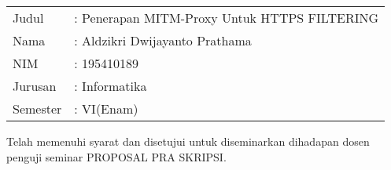 \documentclass[../PROPOSAL_PRA_SKRIPSI_ALDZIKRI_DWIJAYANTO_PRATHAMA.tex]{subfiles}
\begin{document}
\section*{}
\vspace{5ex}
\begin{tabular}{ll}
  Judul    &: Penerapan MITM-Proxy Untuk HTTPS FILTERING\\[5ex]
  Nama     &: Aldzikri Dwijayanto Prathama\\[5ex]
  NIM      &: 195410189\\[5ex]
  Jurusan  &: Informatika\\[5ex]
  Semester &: VI(Enam)\\[5ex]
\end{tabular}
\begin{center}
  Telah memenuhi syarat dan disetujui untuk diseminarkan
  dihadapan dosen penguji seminar PROPOSAL PRA SKRIPSI.
\end{center}
\end{document}
